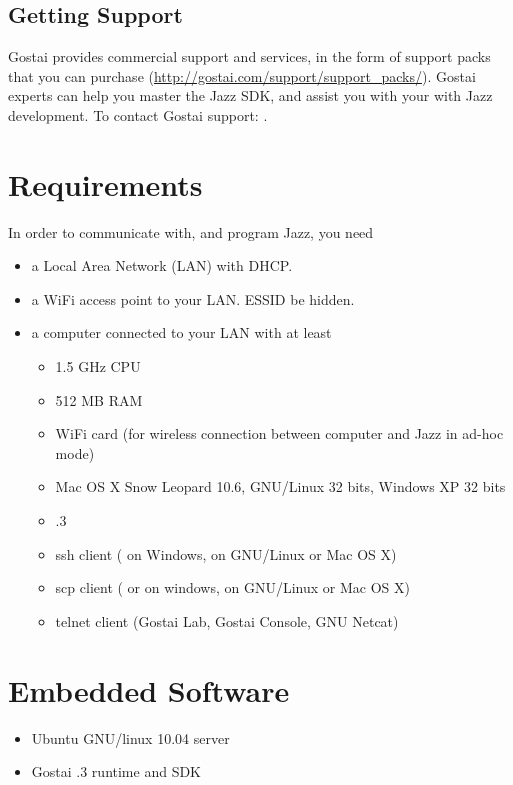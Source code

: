 \subsection{Getting Support}

Gostai provides commercial support and services, in the form of support
packs that you can purchase
(\url{http://gostai.com/support/support_packs/}).  Gostai experts can help
you master the Jazz SDK, and assist you with your with Jazz development.  To
contact Gostai support: .

\section{Requirements}

In order to communicate with, and program Jazz, you need
\begin{itemize}
\item a Local Area Network (LAN) with DHCP.
\item a WiFi access point to your LAN. ESSID  be hidden.
\item a computer connected to your LAN with at least
  \begin{itemize}
  \item 1.5 GHz CPU
  \item 512 MB RAM
  \item WiFi card (for wireless connection between computer and Jazz
    in ad-hoc mode)
  \item Mac OS X Snow Leopard 10.6, GNU/Linux 32 bits, Windows XP 32 bits
  \item {}.3
  \item ssh client ( on Windows,  on GNU/Linux
    or Mac OS X)
  \item scp client ( or  on windows,
         on GNU/Linux or Mac OS X)
  \item telnet client (Gostai Lab, Gostai Console, GNU Netcat)
  \end{itemize}
\end{itemize}

\section{Embedded Software}

\begin{itemize}
\item Ubuntu GNU/linux 10.04 server
\item Gostai .3 runtime and SDK
\end{itemize}

